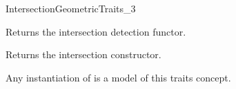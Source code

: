\begin{ccRefConcept}{IntersectionGeometricTraits_3}

\ccOperations

{Returns the intersection detection functor.}


{Returns the intersection constructor.}

\ccHasModels
Any instantiation of  is a model of this traits concept.

\ccSeeAlso
{}\\






\end{ccRefConcept}

\ccRefPageEnd

